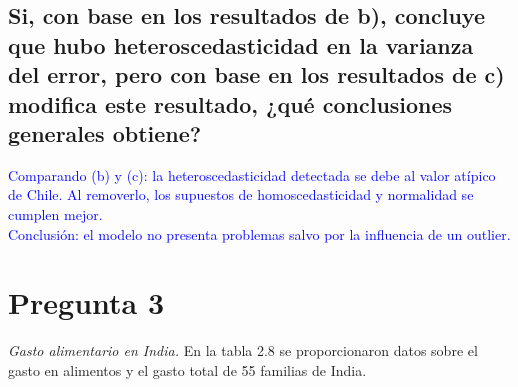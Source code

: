\documentclass[10pt]{article}
\begin{document}
\subsection{Si, con base en los resultados de b), concluye que hubo heteroscedasticidad en la varianza del error, pero con base en los resultados de c) modifica este resultado, ¿qué conclusiones generales obtiene?}
    \textcolor{blue}{
        Comparando (b) y (c): la heteroscedasticidad detectada se debe al valor atípico de Chile.  
        Al removerlo, los supuestos de homoscedasticidad y normalidad se cumplen mejor.\\  
        Conclusión: el modelo no presenta problemas salvo por la influencia de un outlier.
        
    }
\section{Pregunta 3}
\textit{Gasto alimentario en India.} En la tabla 2.8 se proporcionaron datos sobre el gasto en alimentos y el gasto total de 55 familias de India.
\end{document}
